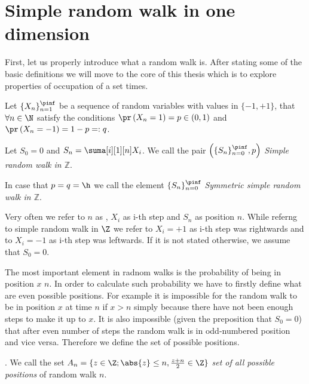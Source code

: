 \chapter{Simple random walk in one dimension}

\begin{rem}
  First, let us properly introduce what a random walk is. After stating some of the basic definitions we will move to the core of this thesis which is to explore properties of occupation of a set times.
\end{rem}

\begin{defn}\label{defn-simple_random_walk_Z}
 Let $\{X_n\}_{n=1}^\pinf$ be a sequence of \iid random variables with values in $\{ -1, +1\}$, that $\forall n \in \N$ satisfy the conditions $\pr \left( X_n=1 \right) =p \in \left( 0,1 \right) $ and $\pr \left( X_n=-1 \right) =1-p=:q$.

 Let $S_0=0$ and $S_n=\suma[i][1][n]X_i$. We call the pair $ \left( \{S_n\}_{n=0}^\pinf, p \right) $ \emph{Simple random walk in $\mathbb{Z}$}.

 In case that $p=q=\h$ we call the element $\{S_n\}_{n=0}^\pinf$ \emph{Symmetric simple random walk in $\mathbb{Z}$}.
\end{defn}

\begin{rem}
 Very often we refer to $n$ as \Time, $X_i$ as i-th step and $S_n$ as position \intime $n$.
 While referng to simple random walk in $\Z$ we refer to $X_i=+1$ as i-th step was rightwards and to $X_i=-1$ as i-th step was leftwards. If it is not stated otherwise, we assume that $S_0=0.$
\end{rem}

\begin{rem}
  The most important element in radnom walks is the probability of being in position $x$ \intime $n$.
  In order to calculate such probability we have to firstly define what are even possible positions. For example it is impossible for the random walk to be in position $x$ at time $n$ if $x>n$ simply because there have not been enough steps to make it up to $x$. It is also impossible (given the preposition that $S_0=0$) that after even number of steps the random walk is in odd-numbered position and vice versa. Therefore we define the set of possible positions.
\end{rem}

\begin{defn}\label{defn-set_all_possible_values}
 \Lrw. We call the set $A_n=\{z \in \Z; \abs{z}\leq n, \frac{z+n}{2}\in \Z \}$ \emph{set of all possible positions} of random walk \rw \intime $n$.
\end{defn}


